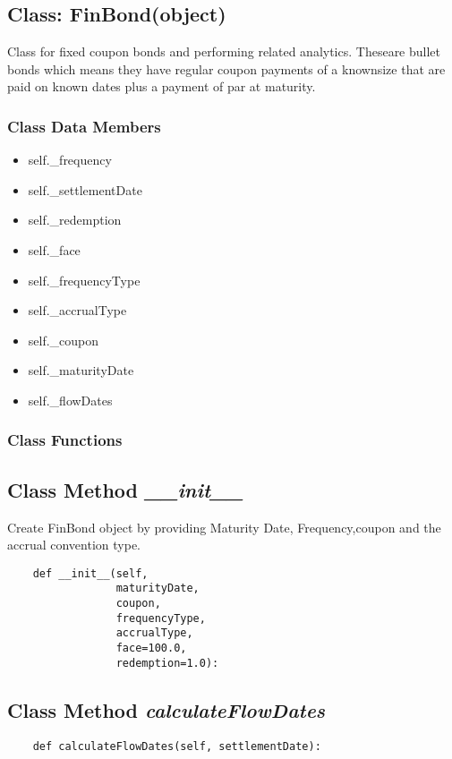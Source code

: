 \documentclass[twoside,11pt]{book}
\begin{document}
\subsection{Class: FinBond(object)}
Class for fixed coupon bonds and performing related analytics. Theseare bullet bonds which means they have regular coupon payments of a knownsize that are paid on known dates plus a payment of par at maturity.

\subsubsection{Class Data Members}
\begin{itemize}
\item{self.\_frequency}
\item{self.\_settlementDate}
\item{self.\_redemption}
\item{self.\_face}
\item{self.\_frequencyType}
\item{self.\_accrualType}
\item{self.\_coupon}
\item{self.\_maturityDate}
\item{self.\_flowDates}
\end{itemize}

\subsubsection{Class Functions}

\subsection{Class Method {\it \_\_init\_\_}}
Create FinBond object by providing Maturity Date, Frequency,coupon and the accrual convention type. 

\begin{lstlisting}
    def __init__(self,
                 maturityDate,
                 coupon,
                 frequencyType,
                 accrualType,
                 face=100.0,
                 redemption=1.0):
\end{lstlisting}

\subsection{Class Method {\it calculateFlowDates}}


\begin{lstlisting}
    def calculateFlowDates(self, settlementDate):
\end{lstlisting}
\end{document}
